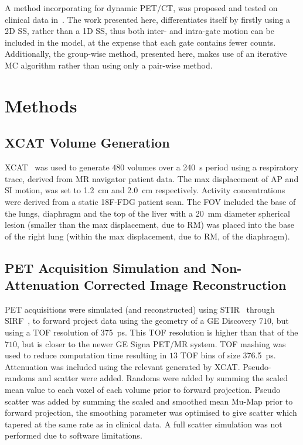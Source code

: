    A method incorporating  for dynamic \gls{PET}/\gls{CT}, was proposed and tested on clinical data in~\cite{Chan2018Non-RigidPET}. The work presented here, differentiates itself by firstly using a \gls{2D} \gls{SS}, rather than a \gls{1D} \gls{SS}, thus both inter- and intra-gate motion can be included in the model, at the expense that each gate contains fewer counts. Additionally, the group-wise method, presented here, makes use of an iterative \gls{MC} algorithm rather than using only a pair-wise method.


\section{Methods} \label{sec:methods}
    \subsection{XCAT Volume Generation} \label{sec:xcat_volume_generation}
        \gls{XCAT}~\cite{Segars2010} was used to generate $480$ volumes over a \SI{240}{\second} period using a respiratory trace, derived from \gls{MR} navigator patient data. The max displacement of \acrlong{AP} and \acrlong{SI} motion, was set to \SI{1.2}{\centi\metre} and \SI{2.0}{\centi\metre} respectively. Activity concentrations were derived from a static \gls{18F-FDG} patient scan. The \gls{FOV} included the base of the lungs, diaphragm and the top of the liver with a \SI{20}{\milli\metre} diameter spherical lesion (smaller than the max displacement, due to \gls{RM}) was placed into the base of the right lung (within the max displacement, due to \gls{RM}, of the diaphragm).
    
    
    \subsection{PET Acquisition Simulation and Non-Attenuation Corrected Image Reconstruction} \label{sec:pet_acquisition_simulation_and_non_attenuation_corrected_image_reconstruction}
        \gls{PET} acquisitions were simulated (and reconstructed) using \gls{STIR}~\cite{Thielemans2012, Nikos2019} through \gls{SIRF}~\cite{Ovtchinnikov2017}, to forward project data using the geometry of a \gls{GE} Discovery $710$, but using a \gls{TOF} resolution of \SI{375}{\pico\second}. This \gls{TOF} resolution is higher than that of the $710$, but is closer to the newer \gls{GE} Signa \gls{PET}/\gls{MR} system. \gls{TOF} mashing was used to reduce computation time resulting in $13$ \gls{TOF} bins of size \SI{376.5}{\pico\second}. Attenuation was included using the relevant  generated by \gls{XCAT}. Pseudo-randoms and scatter were added. Randoms were added by summing the scaled mean value to each voxel of each volume prior to forward projection. Pseudo scatter was added by summing the scaled and smoothed mean \gls{Mu-Map} prior to forward projection, the smoothing parameter was optimised to give scatter which tapered at the same rate as in clinical data. A full scatter simulation was not performed due to software limitations.
        
